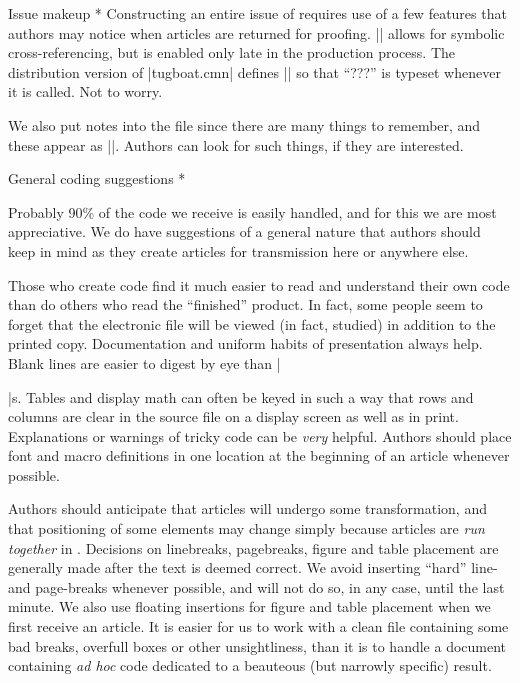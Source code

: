 \subhead * Issue makeup *
Constructing an entire issue of \TUB\/ requires use of a few features
that authors may notice when articles are returned for proofing.
|\xrefto| allows for symbolic cross-referencing, but is enabled only
late in the production process.  The distribution version of
|tugboat.cmn| defines |\xrefto| so that ``???'' is typeset whenever it
is called.  Not to worry.

We also put notes into the file since there are many things to
remember, and these appear as ||.  Authors can look for
such things, if they are interested.


\head * General coding suggestions *

Probably 90\% of the code we receive is easily handled, and for this
we are most appreciative.  We do have suggestions of a general nature
that authors should keep in mind as they create articles for
transmission here or anywhere else.

Those who create code find it much easier to read and understand their
own code than do others who read the ``finished'' product.  In fact,
some people seem to forget that the electronic file will be viewed (in
fact, studied) in addition to the printed copy.  Documentation and
uniform habits of presentation always help.  Blank lines are easier to
digest by eye than |\par|s.  Tables and display math can often be
keyed in such a way that rows and columns are clear in the source file
on a display screen as well as in print.  Explanations or warnings of
tricky code can be {\it very} helpful.  Authors should place font and
macro definitions in one location at the beginning of an article
whenever possible.

Authors should anticipate that articles will undergo some
transformation, and that positioning of some elements may change
simply because articles are {\it run together\/} in \TUB.  Decisions
on linebreaks, pagebreaks, figure and table placement are generally
made after the text is deemed correct. We avoid inserting ``hard''
line- and page-breaks whenever possible, and will not do so, in any
case, until the last minute.  We also use floating insertions for
figure and table placement when we first receive an article.  It is
easier for us to work with a clean file containing some bad breaks,
overfull boxes or other unsightliness, than it is to handle a document
containing {\it ad hoc\/} code dedicated to a beauteous (but
narrowly specific) result.



